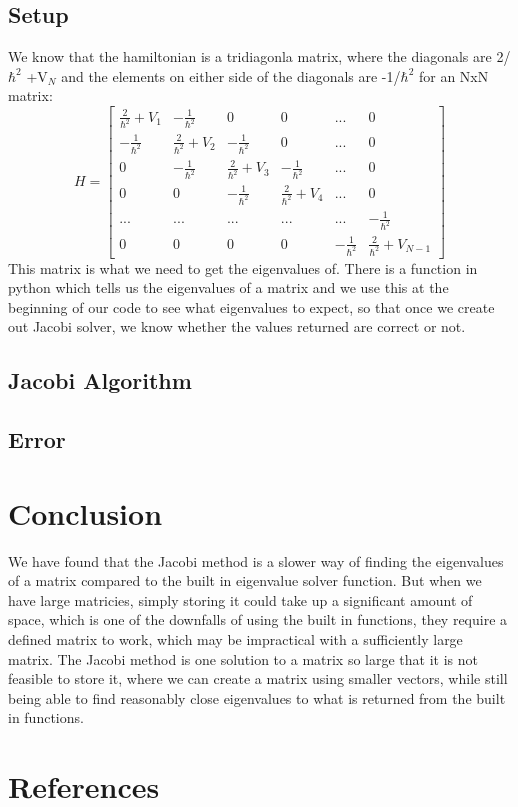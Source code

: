 \documentclass{article}
\begin{document}
\subsection{Setup}
We know that the hamiltonian is a tridiagonla matrix, where the diagonals are 2/$\hbar^2$ +V$_N$ and the elements on either side of the diagonals are -1/$\hbar^2$ for an NxN matrix:
\[
H=\begin{bmatrix}
\frac{2}{\hbar^2}+V_1 & -\frac{1}{\hbar^2}&0&0&...&0\\
 -\frac{1}{\hbar^2}&\frac{2}{\hbar^2}+V_2& -\frac{1}{\hbar^2}&0&...&0\\
0& -\frac{1}{\hbar^2}&\frac{2}{\hbar^2}+V_3& -\frac{1}{\hbar^2}&...&0\\
0&0&-\frac{1}{\hbar^2}&\frac{2}{\hbar^2}+V_4&...&0\\
...&...&...&...&...&-\frac{1}{\hbar^2}\\
0&0&0&0& -\frac{1}{\hbar^2}&\frac{2}{\hbar^2}+V_{N-1}
\end{bmatrix}
\]
This matrix is what we need to get the eigenvalues of. There is a function in python which tells us the eigenvalues of a matrix and we use this at the beginning of our code to see what eigenvalues to expect, so that once we create out Jacobi solver, we know whether the values returned are correct or not.

\subsection{Jacobi Algorithm}

\subsection{Error}

\section{Conclusion}
We have found that the Jacobi method is a slower way of finding the eigenvalues of a matrix compared to the built in eigenvalue solver function. But when we have large matricies, simply storing it could take up a significant amount of space, which is one of the downfalls of using the built in functions, they require a defined matrix to work, which may be impractical with a sufficiently large matrix. The Jacobi method is one solution to a matrix so large that it is not feasible to store it, where we can create a matrix using smaller vectors, while still being able to find reasonably close eigenvalues to what is returned from the built in functions.
\section{References}

\end{document}
